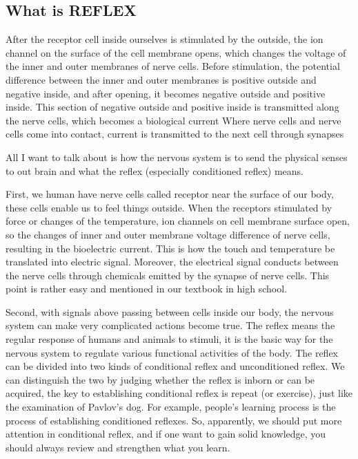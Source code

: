 \documentclass{article}
\begin{document}
\subsection{What is REFLEX}

After the receptor cell inside ourselves is stimulated by the outside, the ion channel on the surface of the cell membrane opens, which changes the voltage of the inner and outer membranes of nerve cells. Before stimulation, the potential difference between the inner and outer membranes is positive outside and negative inside, and after opening, it becomes negative outside and positive inside. This section of negative outside and positive inside is transmitted along the nerve cells, which becomes a biological current Where nerve cells and nerve cells come into contact, current is transmitted to the next cell through synapses

All I want to talk about is how the nervous system is to send the physical senses to out brain and what the reflex (especially conditioned reflex) means.

First, we human have nerve cells called receptor near the surface of our body, these cells enable us to feel things outside. When the receptors stimulated by force or changes of the temperature, ion channels on cell membrane surface open, so the changes of inner and outer membrane voltage difference of nerve cells, resulting in the bioelectric current. This is how the touch and temperature be translated into electric signal. Moreover, the electrical signal conducts between the nerve cells through chemicals emitted by the synapse of nerve cells.  This point is rather easy and mentioned in our textbook in high school.

Second, with signals above passing between cells inside our body, the nervous system can make very complicated actions become true. The reflex means the regular response of humans and animals to stimuli, it is the basic way for the nervous system to regulate various functional activities of the body.\cite{reflex_arc} The reflex can be divided into two kinds of conditional reflex and unconditioned reflex. We can distinguish the two by judging whether the reflex is inborn or can be acquired, the key to establishing conditional reflex is repeat (or exercise), just like the examination of Pavlov's dog. For example, people's learning process is the process of establishing conditioned reflexes. So, apparently, we should put more attention in conditional reflex, and if one want to gain solid knowledge, you should always review and strengthen what you learn.
\end{document}
